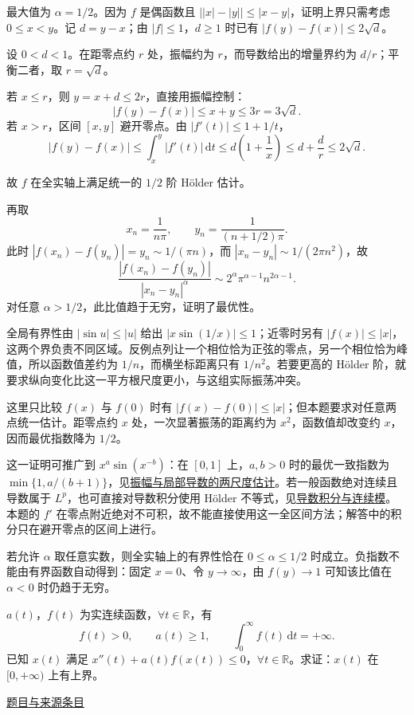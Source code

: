 \documentclass[UTF8,12pt,a4paper,fontset=fandol]{ctexart}
\begin{document}
\begin{solve}\label{ans:fin06-lo:7}

最大值为 $\alpha=1/2$。因为 $f$ 是偶函数且 $\bigl||x|-|y|\bigr|\le|x-y|$，证明上界只需考虑 $0\le x<y$。记 $d=y-x$；由 $|f|\le1$，$d\ge1$ 时已有 $|f(y)-f(x)|\le2\sqrt d$。

设 $0<d<1$。在距零点约 $r$ 处，振幅约为 $r$，而导数给出的增量界约为 $d/r$；平衡二者，取 $r=\sqrt d$。

若 $x\le r$，则 $y=x+d\le2r$，直接用振幅控制：
\[
|f(y)-f(x)|\le x+y\le3r=3\sqrt d.
\]
若 $x>r$，区间 $[x,y]$ 避开零点。由 $|f'(t)|\le1+1/t$，
\[
|f(y)-f(x)|
\le\int_x^y|f'(t)|\,\mathrm dt
\le d\left(1+\frac1x\right)
\le d+\frac d r\le2\sqrt d.
\]

故 $f$ 在全实轴上满足统一的 $1/2$ 阶 Hölder 估计。

再取
\[
x_n=\frac1{n\pi},\qquad y_n=\frac1{(n+1/2)\pi}.
\]
此时 $|f(x_n)-f(y_n)|=y_n\sim1/(\pi n)$，而 $|x_n-y_n|\sim1/(2\pi n^2)$，故
\[
\frac{|f(x_n)-f(y_n)|}{|x_n-y_n|^\alpha}
\sim2^\alpha\pi^{\alpha-1}n^{2\alpha-1}.
\]
对任意 $\alpha>1/2$，此比值趋于无穷，证明了最优性。

全局有界性由 $|\sin u|\le|u|$ 给出 $|x\sin(1/x)|\le1$；近零时另有 $|f(x)|\le|x|$，这两个界负责不同区域。反例点列让一个相位恰为正弦的零点，另一个相位恰为峰值，所以函数值差约为 $1/n$，而横坐标距离只有 $1/n^2$。若要更高的 Hölder 阶，就要求纵向变化比这一平方根尺度更小，与这组实际振荡冲突。

\end{solve}

\begin{remark}[方法与条件]这里只比较 $f(x)$ 与 $f(0)$ 时有 $|f(x)-f(0)|\le|x|$；但本题要求对任意两点统一估计。距零点约 $x$ 处，一次显著振荡的距离约为 $x^2$，函数值却改变约 $x$，因而最优指数降为 $1/2$。

这一证明可推广到 $x^a\sin(x^{-b})$：在 $[0,1]$ 上，$a,b>0$ 时的最优一致指数为 $\min\{1,a/(b+1)\}$，见\hyperref[app:estimate-holder]{振幅与局部导数的两尺度估计}。若一般函数绝对连续且导数属于 $L^p$，也可直接对导数积分使用 Hölder 不等式，见\hyperref[app:estimate-derivative]{导数积分与连续模}。本题的 $f'$ 在零点附近绝对不可积，故不能直接使用这一全区间方法；解答中的积分只在避开零点的区间上进行。

若允许 $\alpha$ 取任意实数，则全实轴上的有界性恰在 $0\le\alpha\le1/2$ 时成立。负指数不能由有界函数自动得到：固定 $x=0$、令 $y\to\infty$，由 $f(y)\to1$ 可知该比值在 $\alpha<0$ 时仍趋于无穷。\end{remark}

\begin{example}[来源序号8]\label{ex:fin06-lo:8}\label{pr:fin06-lo:8}

$a(t)$，$f(t)$ 为实连续函数，$\forall t\in\mathbb{R}$，有
\[
f(t)>0,\qquad a(t)\ge1,\qquad \int_0^{\infty}f(t)\,\mathrm{d}t=+\infty .
\]
已知 $x(t)$ 满足 $x''(t)+a(t)f(x(t))\le0$，$\forall t\in\mathbb{R}$。求证：$x(t)$ 在 $[0,+\infty)$ 上有上界。

\par\href{https://github.com/lzxcr/cmc-mathematics/blob/64916fa1fdbc3e444a652eca204d5669058ee321/src/problems/finals/06/08.md}{题目与来源条目}

\end{example}
\end{document}
